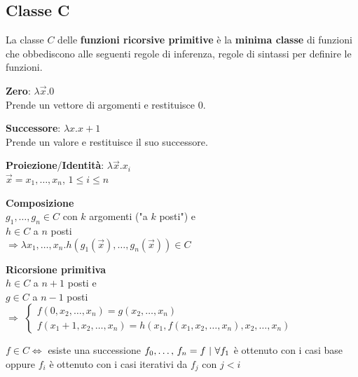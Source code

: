 \documentclass[10pt]{book}
\begin{document}
\subsection{Classe C}
La classe $C$ delle \textbf{funzioni ricorsive primitive} è la \textbf{minima classe} di funzioni che obbediscono alle seguenti regole di inferenza, regole di sintassi per definire le funzioni.\\
\begin{list}{}{\textbf{Casi base}}
	\item \textbf{Zero}: $\lambda \overrightarrow{x}.0$\\
	Prende un vettore di argomenti e restituisce 0.
	\item \textbf{Successore}: $\lambda x.x+1$\\
	Prende un valore e restituisce il suo successore.
	\item \textbf{Proiezione}/\textbf{Identità}: $\lambda \overrightarrow{x}.x_i$\\
	$\overrightarrow{x} = x_1,\ldots, x_n$, $1 \leq i \leq n$
\end{list}
\begin{list}{}{\textbf{Casi iterativi}}
	\item \textbf{Composizione}\\
	$g_1,\ldots, g_n \in C$ con $k$ argomenti ("a $k$ posti") e\\
	$h \in C$ a $n$ posti\\
	$\Rightarrow \lambda x_1, \ldots, x_n.h(g_1(\overrightarrow{x}),\ldots, g_n(\overrightarrow{x})) \in C$
	\item \textbf{Ricorsione primitiva}\\
	$h \in C$ a $n + 1$ posti e\\
	$g \in C$ a $n - 1$ posti\\
	$\Rightarrow$
	\begin{math}
		\left\{
		\begin{array}{l}
			f(0, x_2, \ldots, x_n) = g(x_2, \ldots, x_n)\\
			f(x_1 + 1, x_2, \ldots, x_n) = h(x_1, f(x_1, x_2, \ldots, x_n), x_2,\ldots, x_n)
		\end{array}
		\right.
	\end{math}
\end{list}
$f \in C \Leftrightarrow$ esiste una successione $f_0,\ldots,\,f_n = f\:\:\vline\:\:\forall f_1$ è ottenuto con i casi base oppure $f_i$ è ottenuto con i casi iterativi da $f_j$ con $j < i$
\pagebreak
\end{document}
